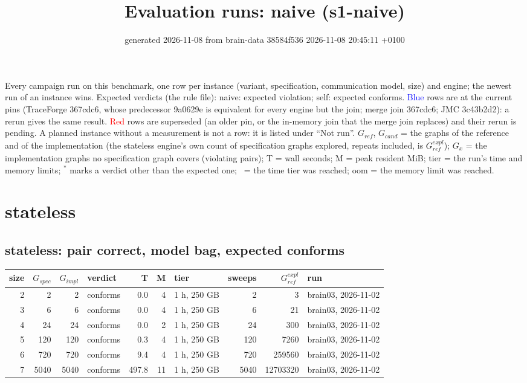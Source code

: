 \documentclass[10pt]{article}
\title{Evaluation runs: \textsf{naive} (s1-naive)}
\author{}
\date{generated 2026-11-08 from brain-data 38584f536 2026-11-08 20:45:11 +0100}
\begin{document}
\maketitle\small
\noindent Every campaign run on this benchmark, one row per instance (variant, specification, communication model, size) and engine; the newest run of an instance wins. Expected verdicts (the rule file): naive: expected violation; self: expected conforms. \textcolor{blue}{Blue} rows are at the current pins (TraceForge 367cdc6, whose predecessor 9a0629e is equivalent for every engine but the join; merge join 367cdc6; JMC 3c43b2d2): a rerun gives the same result. \textcolor{red}{Red} rows are superseded (an older pin, or the in-memory join that the merge join replaces) and their rerun is pending. A planned instance without a measurement is not a row: it is listed under ``Not run''. $G_{\mathit{ref}}$, $G_{\mathit{cand}}$ = the graphs of the reference and of the implementation (the stateless engine's own count of specification graphs explored, repeats included, is $G_{\mathit{ref}}^{\mathit{expl}}$); $G_x$ = the implementation graphs no specification graph covers (violating pairs); T = wall seconds; M = peak resident MiB; tier = the run's time and memory limits; $^{\ast}$ marks a verdict other than the expected one; \faClock\ = the time tier was reached; oom = the memory limit was reached.

\section*{stateless}
\subsection*{stateless: pair \textsf{correct}, model bag, expected conforms}
\begin{longtable}{@{}rrrlrrlrrl@{}}
\toprule
size & $G_{\mathit{spec}}$ & $G_{\mathit{impl}}$ & verdict & T & M & tier & sweeps & $G_{\mathit{ref}}^{\mathit{expl}}$ & run \\
\midrule
\endhead
\color{blue} 2 & 2 & 2 & conforms & 0.0 & 4 & 1 h, 250 GB & 2 & 3 & brain03, 2026-11-02 \\
\color{blue} 3 & 6 & 6 & conforms & 0.0 & 4 & 1 h, 250 GB & 6 & 21 & brain03, 2026-11-02 \\
\color{blue} 4 & 24 & 24 & conforms & 0.0 & 2 & 1 h, 250 GB & 24 & 300 & brain03, 2026-11-02 \\
\color{blue} 5 & 120 & 120 & conforms & 0.3 & 4 & 1 h, 250 GB & 120 & 7260 & brain03, 2026-11-02 \\
\color{blue} 6 & 720 & 720 & conforms & 9.4 & 4 & 1 h, 250 GB & 720 & 259560 & brain03, 2026-11-02 \\
\color{blue} 7 & 5040 & 5040 & conforms & 497.8 & 11 & 1 h, 250 GB & 5040 & 12703320 & brain03, 2026-11-02 \\
\bottomrule
\end{longtable}
\end{document}

